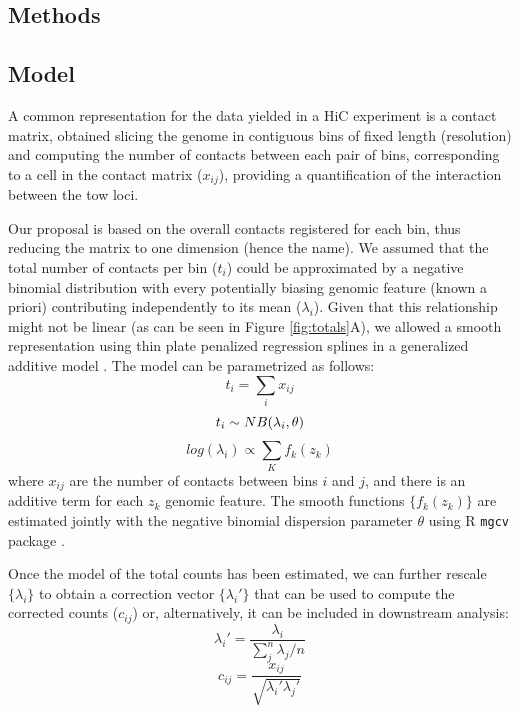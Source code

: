 \documentclass{bioinfo}
\begin{document}
\begin{methods}

\section{Methods}

\subsection{Model}

A common representation for the data yielded in a HiC experiment is a contact matrix, obtained slicing the genome in contiguous bins of fixed length (resolution) and computing the number of contacts between each pair of bins, corresponding to a cell in the contact matrix ($x_{ij}$), providing a quantification of the interaction between the tow loci.

Our proposal is based on the overall contacts registered for each bin, thus reducing the matrix to one dimension (hence the name). We assumed that the total number of contacts per bin ($t_{i}$) could be approximated by a negative binomial distribution with every potentially biasing genomic feature (known a priori) contributing independently to its mean ($\lambda_i$). Given that this relationship might not be linear (as can be seen in Figure \ref{fig:totals}A), we allowed a smooth representation using thin plate penalized regression splines \citep{wood2003thin} in a generalized additive model \citep{wood2011fast}. The model can be parametrized as follows:
$$
t_i = \sum_{i}{x_{ij}}
$$
$$
t_i \sim NB(\lambda_i, \theta) \\
$$
$$
log(\lambda_i) \propto \sum_{K}{f_k(z_k)}
$$
where $x_{ij}$ are the number of contacts between bins $i$ and $j$, and there is an additive term for each $z_k$ genomic feature. The smooth functions $\{f_k(z_k)\}$ are estimated jointly with the negative binomial dispersion parameter $\theta$ using R \citep{coreteam2014r} \texttt{mgcv} package \citep{wood2011fast}.%

Once the model of the total counts has been estimated, we can further rescale  $\{\lambda_i\}$ to obtain a correction vector $\{\lambda_i'\}$ that can be used to compute the corrected counts ($c_{ij}$) or, alternatively, it can be included in downstream analysis:
$$
\lambda_i' = \frac{\lambda_i}{\sum_j^n{\lambda_j}/n}
$$
$$
c_{ij} = \frac{x_{ij}}{\sqrt{\lambda_i'\lambda_j'}}
$$


\end{methods}
\end{document}
